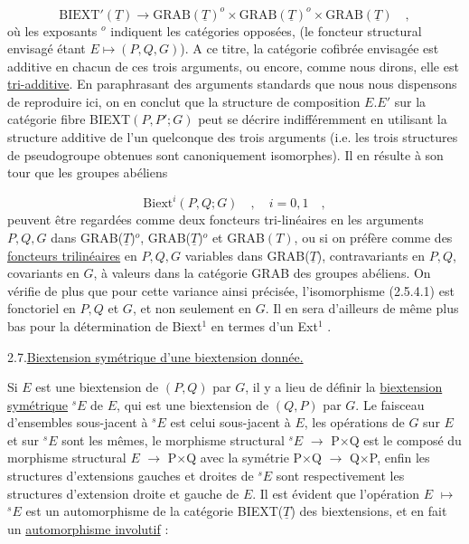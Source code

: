 \begin{equation}\tag{2.6.1}
\mathrm{BIEXT}'(\underline{T}) \longrightarrow \mathrm{GRAB}(\underline{T})^{o}\times\mathrm{GRAB}(\underline{T})^{o}\times \mathrm{GRAB}(\underline{T}) \quad ,
\end{equation}
où les exposants $^{o}$ indiquent les catégories opposées, (le foncteur structural envisagé étant $E \longmapsto (P,Q,G)$). A ce titre, la catégorie cofibrée envisagée est additive en chacun de ces trois arguments, ou encore, comme nous dirons, elle est \underline{tri-additive}. En paraphrasant des arguments standards que nous nous dispensons de reproduire ici, on en conclut que la structure de composition $E.E'$ sur la catégorie fibre BIEXT$(P,P';G)$ peut se décrire indifféremment en utilisant la structure additive de l'un quelconque des trois arguments (i.e. les trois structures de pseudogroupe obtenues sont canoniquement isomorphes). Il en résulte à son tour que les groupes abéliens

\begin{equation}\tag{2.6.2}
\mathrm{Biext}^{i}(P,Q;G) \quad , \quad i=0,1 \quad ,
\end{equation}
peuvent être regardées comme deux foncteurs tri-linéaires en les arguments $P,Q,G$ dans GRAB($\underline{T}$)$^{o}$, GRAB($\underline{T}$)$^{o}$ et GRAB$(T)$, ou si on préfère comme des \underline{foncteurs trilinéaires} en $P,Q,G$ variables dans GRAB($\underline{T}$), contravariants en $P,Q$, covariants en $G$, à valeurs dans la catégorie GRAB des groupes abéliens. On vérifie de plus que pour cette variance ainsi précisée, l'isomorphisme (2.5.4.1) est fonctoriel en $P,Q$ et $G$, et non seulement en $G$. Il en sera d'ailleurs de même plus bas pour la détermination de Biext$^{1}$ en termes d'un Ext$^{1}$ .


2.7.\underline{Biextension symétrique d'une biextension donnée.}

Si $E$ est une biextension de $(P,Q)$ par $G$, il y a lieu de définir la \underline{biextension symétrique} $^{s}E$ de $E$, qui est une biextension de $(Q,P)$ par $G$. Le faisceau d'ensembles sous-jacent à $^{s}E$ est celui sous-jacent à $E$, les opérations de $G$ sur $E$ et sur $^{s}E$ sont les mêmes, le morphisme structural $^{s}E$ $\longrightarrow$ P$\times$Q est le composé du morphisme structural $E$ $\longrightarrow$ P$\times$Q avec la symétrie P$\times$Q $\longrightarrow$ Q$\times$P, enfin les structures
d'extensions gauches et droites de $^{s}E$ sont respectivement les structures d'extension droite et gauche de $E$. Il est évident que l'opération $E$ $\longmapsto$ $^{s}E$ est un automorphisme de la catégorie BIEXT($\underline{T}$) des biextensions, et en fait un \underline{automorphisme involutif} :

